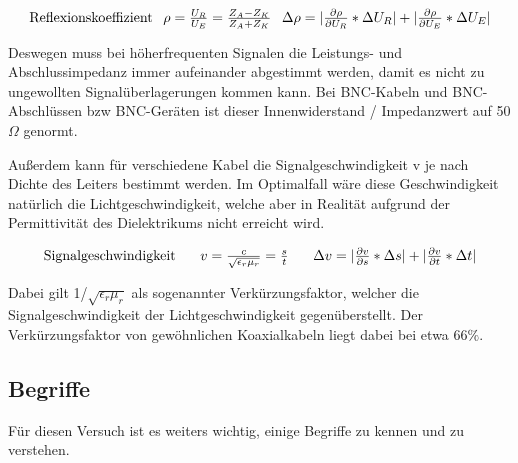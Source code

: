 \documentclass[12pt,a4paper,twoside]{article}
\begin{document}
\begin{equation}
    \label{eq:Reflexionskoeffizient}
    \centerline{Reflexionskoeffizient \\ $\rho = \frac{U_R}{U_E} = \frac{Z_A - Z_K}{Z_A + Z_K}$ \\ $\Delta \rho = \vert \frac{\partial \rho}{\partial U_R} * \Delta U_R \vert + \vert \frac{\partial \rho}{\partial U_E} * \Delta U_E \vert$}
\end{equation}

\noindent
Deswegen muss bei höherfrequenten Signalen die Leistungs- und Abschlussimpedanz immer aufeinander abgestimmt werden, damit es nicht zu ungewollten Signalüberlagerungen kommen kann.
Bei BNC-Kabeln und BNC-Abschlüssen bzw BNC-Geräten ist dieser Innenwiderstand / Impedanzwert auf 50 $\Omega$ genormt. \newline

\noindent
Außerdem kann für verschiedene Kabel die Signalgeschwindigkeit v je nach Dichte des Leiters bestimmt werden.
Im Optimalfall wäre diese Geschwindigkeit natürlich die Lichtgeschwindigkeit, welche aber in Realität aufgrund der Permittivität des Dielektrikums nicht erreicht wird.

\begin{equation}
    \label{eq:Signalgeschwindigkeit}
    \centerline{Signalgeschwindigkeit \\ $v = \frac{c}{\sqrt{\epsilon_r \mu_r}} = \frac{s}{t}$ \\ $\Delta v = \vert \frac{\partial v}{\partial s} * \Delta s \vert + \vert \frac{\partial v}{\partial t} * \Delta t \vert $}
\end{equation}

\noindent
Dabei gilt 1/$\sqrt{\epsilon_r \mu_r}$ als sogenannter Verkürzungsfaktor, welcher die Signalgeschwindigkeit der Lichtgeschwindigkeit gegenüberstellt.
Der Verkürzungsfaktor von gewöhnlichen Koaxialkabeln liegt dabei bei etwa 66$\%$.

\subsection{Begriffe}

Für diesen Versuch ist es weiters wichtig, einige Begriffe zu kennen und zu verstehen.
\end{document}
